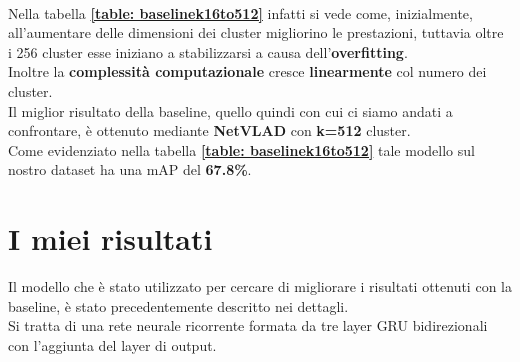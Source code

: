 \\Nella tabella \textbf{\ref{table: baselinek16to512}} infatti si vede come, inizialmente, all'aumentare delle dimensioni dei cluster migliorino le prestazioni, tuttavia oltre i 256 cluster esse iniziano a stabilizzarsi a causa dell'\textbf{overfitting}.
\\Inoltre la \textbf{complessità computazionale} cresce \textbf{linearmente} col numero dei cluster.\\
\linebreak
Il miglior risultato della baseline, quello quindi con cui ci siamo andati a confrontare, è ottenuto mediante \textbf{NetVLAD} con \textbf{k=512} cluster.
\\Come evidenziato nella tabella \textbf{\ref{table: baselinek16to512}} tale modello sul nostro dataset ha una mAP del \textbf{67.8\%}.
\section{I miei risultati}
Il modello che è stato utilizzato per cercare di migliorare i risultati ottenuti con la baseline, è stato precedentemente descritto nei dettagli.
\\Si tratta di una rete neurale ricorrente formata da tre layer GRU bidirezionali con l'aggiunta del layer di output.
